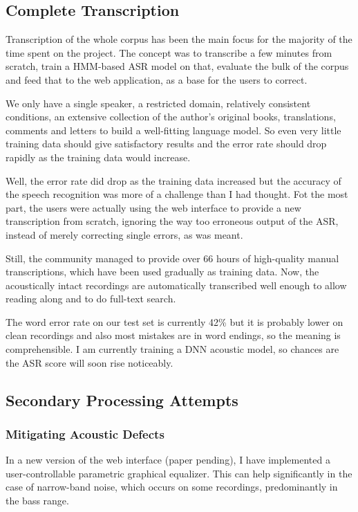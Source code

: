 \documentclass[a4paper,11pt]{article}
\begin{document}
\subsection{Complete Transcription}

Transcription of the whole corpus has been the main focus for the majority of
the time spent on the project. The concept was to transcribe a few minutes from
scratch, train a HMM-based ASR model on that, evaluate the bulk of the corpus
and feed that to the web application, as a base for the users to correct.

We only have a single speaker, a restricted domain, relatively consistent
conditions, an extensive collection of the author's original books,
translations, comments and letters to build a well-fitting language model. So
even very little training data should give satisfactory results and the error
rate should drop rapidly as the training data would increase.

Well, the error rate did drop as the training data increased but the accuracy of
the speech recognition was more of a challenge than I had thought. Fot the most
part, the users were actually using the web interface to provide a new
transcription from scratch, ignoring the way too erroneous output of the ASR,
instead of merely correcting single errors, as was meant.

Still, the community managed to provide over 66 hours of high-quality manual
transcriptions, which have been used gradually as training data. Now, the
acoustically intact recordings are automatically transcribed well enough to
allow reading along and to do full-text search.

The word error rate on our test set is currently 42\% but it is probably lower
on clean recordings and also most mistakes are in word endings, so the meaning
is comprehensible. I am currently training a DNN acoustic model, so chances are
the ASR score will soon rise noticeably.

\subsection{Secondary Processing Attempts}

\subsubsection{Mitigating Acoustic Defects}

In a new version of the web interface (paper pending), I have implemented a
user-controllable parametric graphical equalizer. This can help significantly in
the case of narrow-band noise, which occurs on some recordings, predominantly in
the bass range.
\end{document}
